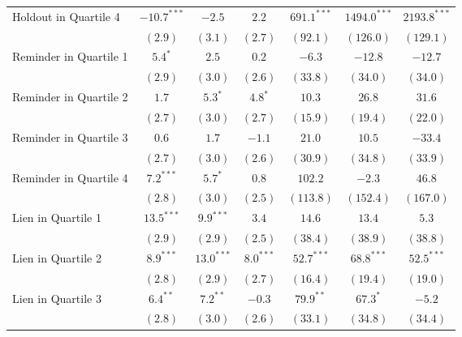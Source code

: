 \begin{center}
\begin{longtable}{l c c c c c c }
Holdout in Quartile 4      & $-10.7^{***}$ & $-2.5$        & $2.2$        & $691.1^{***}$ & $1494.0^{***}$ & $2193.8^{***}$ \\
                           & $(2.9)$       & $(3.1)$       & $(2.7)$      & $(92.1)$      & $(126.0)$      & $(129.1)$      \\
Reminder in Quartile 1     & $5.4^{*}$     & $2.5$         & $0.2$        & $-6.3$        & $-12.8$        & $-12.7$        \\
                           & $(2.9)$       & $(3.0)$       & $(2.6)$      & $(33.8)$      & $(34.0)$       & $(34.0)$       \\
Reminder in Quartile 2     & $1.7$         & $5.3^{*}$     & $4.8^{*}$    & $10.3$        & $26.8$         & $31.6$         \\
                           & $(2.7)$       & $(3.0)$       & $(2.7)$      & $(15.9)$      & $(19.4)$       & $(22.0)$       \\
Reminder in Quartile 3     & $0.6$         & $1.7$         & $-1.1$       & $21.0$        & $10.5$         & $-33.4$        \\
                           & $(2.7)$       & $(3.0)$       & $(2.6)$      & $(30.9)$      & $(34.8)$       & $(33.9)$       \\
Reminder in Quartile 4     & $7.2^{***}$   & $5.7^{*}$     & $0.8$        & $102.2$       & $-2.3$         & $46.8$         \\
                           & $(2.8)$       & $(3.0)$       & $(2.5)$      & $(113.8)$     & $(152.4)$      & $(167.0)$      \\
Lien in Quartile 1         & $13.5^{***}$  & $9.9^{***}$   & $3.4$        & $14.6$        & $13.4$         & $5.3$          \\
                           & $(2.9)$       & $(2.9)$       & $(2.5)$      & $(38.4)$      & $(38.9)$       & $(38.8)$       \\
Lien in Quartile 2         & $8.9^{***}$   & $13.0^{***}$  & $8.0^{***}$  & $52.7^{***}$  & $68.8^{***}$   & $52.5^{***}$   \\
                           & $(2.8)$       & $(2.9)$       & $(2.7)$      & $(16.4)$      & $(19.4)$       & $(19.0)$       \\
Lien in Quartile 3         & $6.4^{**}$    & $7.2^{**}$    & $-0.3$       & $79.9^{**}$   & $67.3^{*}$     & $-5.2$         \\
                           & $(2.8)$       & $(3.0)$       & $(2.6)$      & $(33.1)$      & $(34.8)$       & $(34.4)$       \\

\end{longtable}
\end{center}

